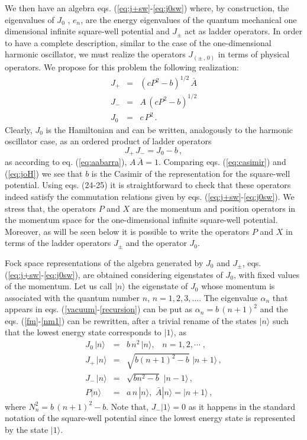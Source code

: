 \documentclass[a4paper,12pt]{article}
\begin{document}
We then have an algebra eqs. (\ref{eq:j+sw}-\ref{eq:j0sw}) where,
by construction, the eigenvalues of $J_0$ , $e_n$, are the energy
eigenvalues of the quantum mechanical one dimensional infinite
square-well potential and $J_{\pm}$ act as ladder operators. In order
to have a complete description, similar to the case of the one-dimensional
harmonic oscillator, we must realize the operators $J_{(\pm \, ,\, 0)}$ in
terms of physical operators. We propose for this problem the
following realization: 
\begin{eqnarray}
    J_{+} & = &  (c P^2 -b)^{1/2}  \,\bar{A} 
    \label{eq:j+}  \\
     J_{-} & = & A \, (c P^2 -b)^{1/2}
    \label{eq:j-}  \\
    J_{0} & = & c \, P^2  \, .
    \label{eq:j0}
\end{eqnarray}
Clearly, $J_{0}$ is the Hamiltonian and can be written, analogously 
to the harmonic oscillator case, as an ordered product of 
ladder operators 
\begin{equation}
     J_{+} \, J_{-} = J_{0} - b \, ,
    \label{eq:joH}
\end{equation}
as according to eq. (\ref{eq:aabarra}), 
$A \, \bar{A} = 1$.  Comparing eqs. (\ref{eq:casimir}) and (\ref{eq:joH})
we see that $b$ is the Casimir of the representation for the
square-well potential.
Using eqs. (24-25) it is straightforward to 
check that these operators indeed 
satisfy the commutation relations given by eqs. (\ref{eq:j+sw}-\ref{eq:j0sw}).
We stress that, the operators $P$ and $X$
are the momentum and position operators in the momentum space
for the one-dimensional infinite square-well potential. 
Moreover, as will be seen below it is possible 
to write the operators $P$ and 
$X$ in terms of the ladder operators
$J_\pm$ and the operator $J_0$.

Fock space representations of the algebra generated by $J_{0}$ and $J_{\pm}$,  
eqs. (\ref{eq:j+sw}-\ref{eq:j0sw}), are 
obtained considering eigenstates of $J_{0}$, with fixed values 
of the momentum. Let us call $| n \rangle$ the 
eigenstate of $J_{0}$ 
whose momentum is associated with the quantum number $n$, 
$n= 1, 2, 3, \ldots$.  The eigenvalue $\alpha_{n}$ that appears in 
eqs. (\ref{vacuum}-\ref{recursion}) can be put as  
$\alpha_{n} = b \, (n+1)^2$ 
and the eqs. (\ref{fm}-\ref{nm1}) can 
be rewritten, after a trivial rename of the states $|n\rangle$ 
such that the lowest energy state corresponds to $|1\rangle$, 
as 
\begin{eqnarray}
    J_{0} \, |n\rangle &=& b \, n^2 \, |n\rangle , \; \; \; n = 1,2, 
\cdots \; ,
    \label{eq:fmsw}  \\
   J_{+} \, |n\rangle &=& \sqrt{b(n+1)^2 -b} \, \, |n+1\rangle \, , 
    \label{eq:nmsw}  \\
   J_{-} \, |n\rangle &=& \sqrt{b n^2 -b} \, \, |n-1\rangle \, ,
    \label{eq:nm1sw}  \\
    P |n\rangle &=& a \, n \, |n \rangle , \, \, \bar{A} |n\rangle =  
|n+1 \rangle \,  ,
\end{eqnarray}
where $N_{n}^2 = b \, (n+1)^2 - b$. Note that, $J_- |1\rangle = 0$
as it happens in the standard notation of the square-well 
potential since the lowest energy state is represented by the
state $|1\rangle$.
    
\end{document}
